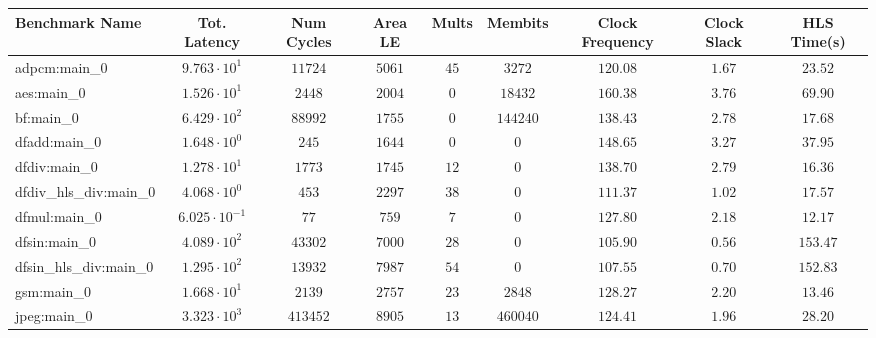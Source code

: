 \begin{tabular}{|l|c|c|c|c|c|c|c|c|}
\hline
Benchmark Name          & Tot. Latency            & Num Cycles & Area LE   & Mults   & Membits    & Clock Frequency & Clock Slack & HLS Time(s) \\
\hline
adpcm:main\_0           & $ 9.763 \cdot 10^{1}  $ & $ 11724  $ & $ 5061  $ & $ 45  $ & $ 3272   $ & $ 120.08      $ & $ 1.67    $ & $ 23.52   $ \\
aes:main\_0             & $ 1.526 \cdot 10^{1}  $ & $ 2448   $ & $ 2004  $ & $ 0   $ & $ 18432  $ & $ 160.38      $ & $ 3.76    $ & $ 69.90   $ \\
bf:main\_0              & $ 6.429 \cdot 10^{2}  $ & $ 88992  $ & $ 1755  $ & $ 0   $ & $ 144240 $ & $ 138.43      $ & $ 2.78    $ & $ 17.68   $ \\
dfadd:main\_0           & $ 1.648 \cdot 10^{0}  $ & $ 245    $ & $ 1644  $ & $ 0   $ & $ 0      $ & $ 148.65      $ & $ 3.27    $ & $ 37.95   $ \\
dfdiv:main\_0           & $ 1.278 \cdot 10^{1}  $ & $ 1773   $ & $ 1745  $ & $ 12  $ & $ 0      $ & $ 138.70      $ & $ 2.79    $ & $ 16.36   $ \\
dfdiv\_hls\_div:main\_0 & $ 4.068 \cdot 10^{0}  $ & $ 453    $ & $ 2297  $ & $ 38  $ & $ 0      $ & $ 111.37      $ & $ 1.02    $ & $ 17.57   $ \\
dfmul:main\_0           & $ 6.025 \cdot 10^{-1} $ & $ 77     $ & $ 759   $ & $ 7   $ & $ 0      $ & $ 127.80      $ & $ 2.18    $ & $ 12.17   $ \\
dfsin:main\_0           & $ 4.089 \cdot 10^{2}  $ & $ 43302  $ & $ 7000  $ & $ 28  $ & $ 0      $ & $ 105.90      $ & $ 0.56    $ & $ 153.47  $ \\
dfsin\_hls\_div:main\_0 & $ 1.295 \cdot 10^{2}  $ & $ 13932  $ & $ 7987  $ & $ 54  $ & $ 0      $ & $ 107.55      $ & $ 0.70    $ & $ 152.83  $ \\
gsm:main\_0             & $ 1.668 \cdot 10^{1}  $ & $ 2139   $ & $ 2757  $ & $ 23  $ & $ 2848   $ & $ 128.27      $ & $ 2.20    $ & $ 13.46   $ \\
jpeg:main\_0            & $ 3.323 \cdot 10^{3}  $ & $ 413452 $ & $ 8905  $ & $ 13  $ & $ 460040 $ & $ 124.41      $ & $ 1.96    $ & $ 28.20   $ \\

\end{tabular}
